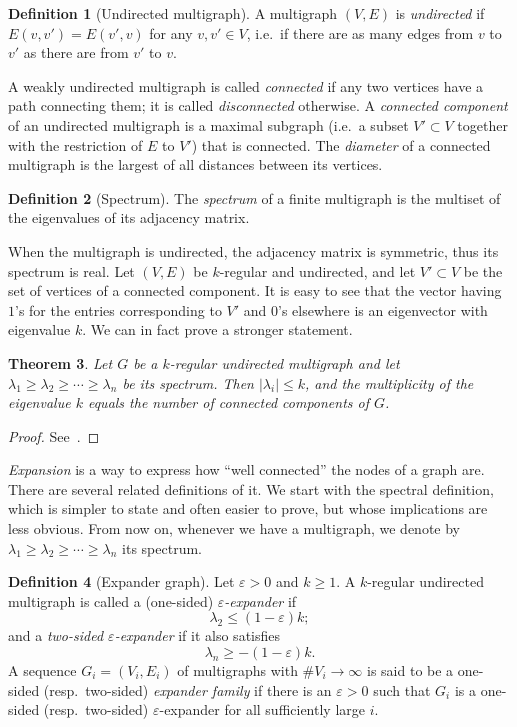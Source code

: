 \documentclass[10pt]{article}
\theoremstyle{plain}
\newtheorem{theorem}{Theorem}
\theoremstyle{definition}
\newtheorem{definition}[theorem]{Definition}
\begin{document}
\begin{prposition}
\begin{definition}[Undirected multigraph]
  A multigraph $(V,E)$ is \emph{undirected} if $E(v,v') = E(v',v)$ for
  any $v,v'∈V$, i.e.\ if there are as many edges from $v$ to $v'$ as
  there are from $v'$ to $v$.
\end{definition}

A weakly undirected multigraph is called \emph{connected} if any two
vertices have a path connecting them; it is called \emph{disconnected}
otherwise. %
A \emph{connected component} of an undirected multigraph is a maximal
subgraph (i.e.\ a subset $V'⊂V$ together with the restriction of $E$
to $V'$) that is connected. %
The \emph{diameter} of a connected multigraph is the largest of all
distances between its vertices. %

\begin{definition}[Spectrum]
  The \emph{spectrum} of a finite multigraph is the multiset of the
  eigenvalues of its adjacency matrix.
\end{definition}

When the multigraph is undirected, the adjacency matrix is symmetric,
thus its spectrum is real. %
Let $(V,E)$ be $k$-regular and undirected, and let $V'⊂V$ be the set
of vertices of a connected component. %
It is easy to see that the vector having $1$'s for the entries
corresponding to $V'$ and $0$'s elsewhere is an eigenvector with
eigenvalue $k$. %
We can in fact prove a stronger statement.

\begin{theorem}
  Let $G$ be a $k$-regular undirected multigraph and let
  $λ_1 ≥ λ_2 ≥ \cdots ≥ λ_n$ be its spectrum. %
  Then $|λ_i| ≤ k$, and the multiplicity of the eigenvalue $k$ equals
  the number of connected components of $G$.
\end{theorem}
\begin{proof}
  See~\cite[Chap.~3]{trevisan-graphs}.
\end{proof}

\emph{Expansion} is a way to express how ``well connected'' the nodes
of a graph are. %
There are several related definitions of it. %
We start with the spectral definition, which is simpler to state and
often easier to prove, but whose implications are less obvious. %
From now on, whenever we have a multigraph, we denote by
$λ_1 ≥ λ_2 ≥ \cdots ≥ λ_n$ its spectrum.

\begin{definition}[Expander graph]
  Let $ε>0$ and $k≥1$. %
  A $k$-regular undirected multigraph is called a (one-sided)
  \emph{$ε$-expander} if
  \[λ_2≤(1-ε)k;\]
  and a \emph{two-sided $ε$-expander} if it also satisfies
  \[λ_n≥-(1-ε)k.\] %
  A sequence $G_i=(V_i,E_i)$ of multigraphs with $\#V_i→∞$ is said to
  be a one-sided (resp.\ two-sided) \emph{expander family} if there is
  an $ε>0$ such that $G_i$ is a one-sided (resp.\ two-sided)
  $ε$-expander for all sufficiently large $i$.
\end{definition}


\end{prposition}
\end{document}
